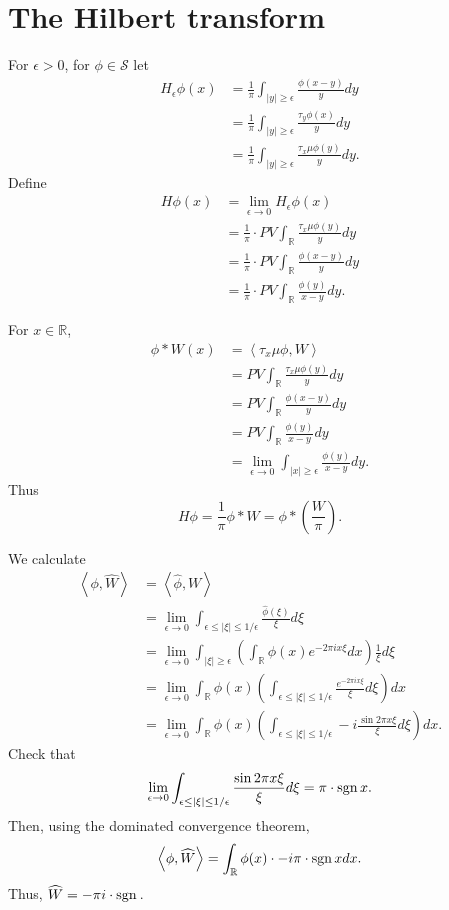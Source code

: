 \documentclass{article}
\newcommand{\inner}[2]{\left\langle #1, #2 \right\rangle}
\newcommand{\sgn}{\ensuremath\mathrm{sgn}\,}
\theoremstyle{definition}
\begin{document}
\section{The Hilbert transform}
For $\epsilon>0$, for $\phi \in \mathscr{S}$ let
\begin{align*}
H_\epsilon \phi(x) &=\frac{1}{\pi} \int_{|y| \geq \epsilon} \frac{\phi(x-y)}{y} dy\\
&=\frac{1}{\pi} \int_{|y| \geq \epsilon} \frac{\tau_y \phi(x)}{y} dy\\
&=\frac{1}{\pi} \int_{|y| \geq \epsilon} \frac{\tau_x \mu \phi(y)}{y} dy.
\end{align*}
Define
\begin{align*}
H\phi(x)&=\lim_{\epsilon \to 0} H_\epsilon \phi(x)\\
&=\frac{1}{\pi} \cdot PV \int_{\mathbb{R}} \frac{\tau_x \mu \phi(y)}{y} dy\\
&=\frac{1}{\pi} \cdot PV \int_{\mathbb{R}} \frac{\phi(x-y)}{y} dy\\
&=\frac{1}{\pi} \cdot PV \int_{\mathbb{R}} \frac{\phi(y)}{x-y} dy.
\end{align*}

For $x \in \mathbb{R}$,
\begin{align*}
\phi*W(x)&=\inner{\tau_x \mu \phi}{W}\\
&=PV \int_{\mathbb{R}} \frac{\tau_x \mu \phi(y)}{y} dy\\
&=PV \int_{\mathbb{R}} \frac{\phi(x-y)}{y} dy\\
&=PV \int_{\mathbb{R}} \frac{\phi(y)}{x-y} dy\\
&=\lim_{\epsilon \to 0} \int_{|x| \geq \epsilon} \frac{\phi(y)}{x-y} dy.
\end{align*}
Thus
\[
H \phi = \frac{1}{\pi} \phi*W = \phi*\left( \frac{W}{\pi}\right).
\]

We calculate
\begin{align*}
\inner{\phi}{\widehat{W}}&=\inner{\widehat{\phi}}{W}\\
&= \lim_{\epsilon \to 0} \int_{\epsilon \leq |\xi| \leq 1/\epsilon} \frac{\widehat{\phi}(\xi)}{\xi} d\xi\\
&=\lim_{\epsilon \to 0} \int_{|\xi| \geq \epsilon} \left( \int_{\mathbb{R}} \phi(x) e^{-2\pi ix\xi} dx \right) \frac{1}{\xi} d\xi\\
&=\lim_{\epsilon \to 0}\int_{\mathbb{R}} \phi(x) \left( \int_{\epsilon \leq |\xi| \leq 1/\epsilon} \frac{e^{-2\pi ix\xi}}{\xi} d\xi\right) dx\\
&=\lim_{\epsilon \to 0}\int_{\mathbb{R}} \phi(x) \left( \int_{\epsilon \leq |\xi| \leq 1/\epsilon} -i \frac{\sin 2\pi x\xi}{\xi} d\xi\right) dx.
\end{align*}
Check that
\[
\lim_{\epsilon \to 0} \int_{\epsilon \leq |\xi| \leq 1/\epsilon}  \frac{\sin 2\pi x\xi}{\xi} d\xi
=\pi \cdot \sgn x.
\]
Then, using the dominated convergence theorem,
\[
\inner{\phi}{\widehat{W}} = \int_{\mathbb{R}} \phi(x) \cdot -i\pi \cdot \sgn x dx.
\]
Thus, $\widehat{W} = -\pi i \cdot\sgn$. 
\end{document}
